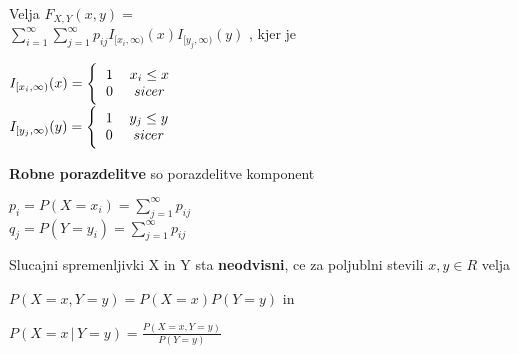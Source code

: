 \documentclass{article}
\begin{document}
\begin{multicols}{3}
\begin{enumerate}
\begin{center}
        \end{center}
        Velja
        \begin{math}
            F_{X,Y}(x, y) =
        \end{math}\\
        \begin{math}
            \sum_{i = 1}^{\infty} \sum_{j = 1}^{\infty} p_{ij}  I_{[x_i, \infty)} (x) I_{[y_j, \infty)} (y)
        \end{math}
        , kjer je
        \begin{center}
            \begin{math}
                I_{[x_i, \infty)} (x) = 
                \Bigg\{\begin{tabular}{cc}
                    $1$  & $x_i \leq x$ \\
                    $0$  & $sicer$ \\
                  \end{tabular}
            \end{math} \\
            \begin{math}
                I_{[y_j, \infty)} (y) = 
                \Bigg\{\begin{tabular}{cc}
                    $1$  & $y_j \leq y$ \\
                    $0$  & $sicer$ \\
                  \end{tabular}
            \end{math}
        \end{center}
\end{enumerate}
\textbf{Robne porazdelitve} so porazdelitve komponent\\
\begin{center}
    \begin{math}
        p_i = P(X = x_i) = \sum_{j = 1}^{\infty} p_{ij}
    \end{math}\\
    \begin{math}
        q_j = P(Y = y_i) = \sum_{j = 1}^{\infty} p_{ij}
    \end{math}
\end{center}
Slucajni spremenljivki X in Y sta \textbf{neodvisni},
ce za poljublni stevili $x,y \in R$ velja
\begin{center}
    \begin{math}
        P(X = x, Y = y) = P(X = x)P(Y = y)
    \end{math} in
\end{center}
\begin{center}
    \begin{math}
        P(X = x\, |\, Y = y) = \frac{P(X = x, Y = y)}{P(Y = y)}
    \end{math}
\end{center}


\end{multicols}
\end{document}
